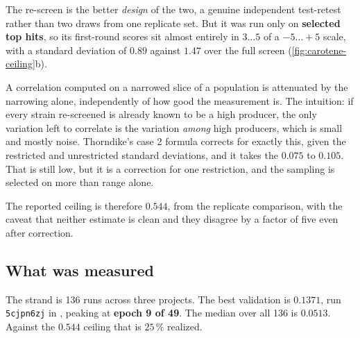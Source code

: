  The re-screen is the
better \emph{design} of the two, a genuine independent test-retest rather than two draws
from one replicate set. But it was run only on \textbf{selected top hits}, so its first-round
scores sit almost entirely in $3 \ldots 5$ of a $-5 \ldots +5$ scale, with a standard
deviation of $0.89$ against $1.47$ over the full screen (\cref{fig:carotene-ceiling}b).

A correlation computed on a narrowed slice of a population is attenuated by the narrowing
alone, independently of how good the measurement is. The intuition: if every strain
re-screened is already known to be a high producer, the only variation left to correlate is
the variation \emph{among} high producers, which is small and mostly noise. Thorndike's case
2 formula corrects for exactly this, given the restricted and unrestricted standard
deviations, and it takes the $0.075$ to $0.105$. That is still low, but it is a correction
for one restriction, and the sampling is selected on more than range alone.

The reported ceiling is therefore $0.544$, from the replicate comparison, with the caveat
that neither estimate is clean and they disagree by a factor of five even after correction.


\subsection{What was measured}

The strand is 136 runs across three projects. The best validation
 is $\mathbf{0.1371}$, run \texttt{5cjpn6zj} in
, peaking at \textbf{epoch 9 of 49}. The median over all 136 is
$0.0513$. Against the $0.544$ ceiling that is $25\,\%$ realized.

